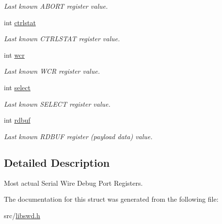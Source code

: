 \begin{DoxyCompactItemize}
\begin{DoxyCompactList}\small\item\em Last known ABORT register value. \item\end{DoxyCompactList}\item 
\hypertarget{structswd__swdp__t_ab238faa3bad9500c235d38818dc04b80}{
int \hyperlink{structswd__swdp__t_ab238faa3bad9500c235d38818dc04b80}{ctrlstat}}
\label{structswd__swdp__t_ab238faa3bad9500c235d38818dc04b80}

\begin{DoxyCompactList}\small\item\em Last known CTRLSTAT register value. \item\end{DoxyCompactList}\item 
\hypertarget{structswd__swdp__t_a7dd5a91a546abcda7167c24ce263239c}{
int \hyperlink{structswd__swdp__t_a7dd5a91a546abcda7167c24ce263239c}{wcr}}
\label{structswd__swdp__t_a7dd5a91a546abcda7167c24ce263239c}

\begin{DoxyCompactList}\small\item\em Last known WCR register value. \item\end{DoxyCompactList}\item 
\hypertarget{structswd__swdp__t_a046581282ce74322ca8f8da0272e3d02}{
int \hyperlink{structswd__swdp__t_a046581282ce74322ca8f8da0272e3d02}{select}}
\label{structswd__swdp__t_a046581282ce74322ca8f8da0272e3d02}

\begin{DoxyCompactList}\small\item\em Last known SELECT register value. \item\end{DoxyCompactList}\item 
\hypertarget{structswd__swdp__t_aff754afb02e53923f876c29f2ccc5495}{
int \hyperlink{structswd__swdp__t_aff754afb02e53923f876c29f2ccc5495}{rdbuf}}
\label{structswd__swdp__t_aff754afb02e53923f876c29f2ccc5495}

\begin{DoxyCompactList}\small\item\em Last known RDBUF register (payload data) value. \item\end{DoxyCompactList}\end{DoxyCompactItemize}


\subsection{Detailed Description}
Most actual Serial Wire Debug Port Registers. 

The documentation for this struct was generated from the following file:\begin{DoxyCompactItemize}
\item 
src/\hyperlink{libswd_8h}{libswd.h}\end{DoxyCompactItemize}
